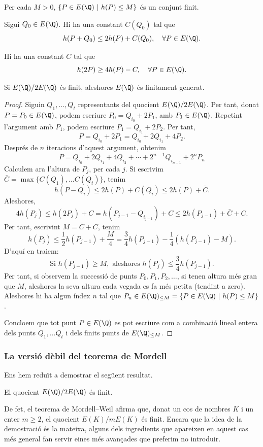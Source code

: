 \begin{remark}
Per cada $M>0$, $\{ P\in E(\Q) ~|~ h(P) \leq M\}$ és un conjunt finit.
\end{remark}

\begin{lemma}
Sigui $Q_0\in E(\Q)$. Hi ha una constant $C(Q_0)$ tal que
\[
h(P+Q_0)\leq 2h(P) + C(Q_0), \quad \forall P\in E(\Q).
\]
\end{lemma}
\begin{lemma}
Hi ha una constant $C$ tal que
\[
h(2P)\geq 4h(P) - C,\quad \forall P\in E(\Q).
\]
\end{lemma}

\begin{theorem}
Si $E(\Q)/2E(\Q)$ és finit, aleshores $E(\Q)$ és finitament generat.
\end{theorem}
\begin{proof}
Siguin $Q_1,\ldots, Q_t$ representants del quocient $E(\Q)/2E(\Q)$.
Per tant, donat $P=P_0\in E(\Q)$, podem escriure $P_0 = Q_{i_0} + 2P_1$, amb $P_1\in E(\Q)$. Repetint l'argument amb $P_1$, podem escriure $P_1 = Q_{i_1} + 2P_2$. Per tant,
\[
P = Q_{i_0} + 2P_1 = Q_{i_0} + 2Q_{i_1} + 4P_2.
\]
Després de $n$ iteracions d'aquest argument, obtenim
\[
P = Q_{i_0} + 2Q_{i_1} + 4Q_{i_2}+\cdots +2^{n-1} Q_{i_{n-1}} + 2^{n}P_n
\]
Calculem ara l'altura de $P_j$, per cada $j$. Si escrivim $\bar C = \max\{ C(Q_1),\ldots C(Q_t)\}$, tenim
\[
h(P - Q_i) \leq 2h(P) + C(Q_i)\leq 2h(P) + \bar C.
\]
Aleshores,
\[
4h(P_j)\leq h(2P_j) + C = h(P_{j-1} - Q_{i_{j-1}}) + C\leq 2h(P_{j-1}) + \bar C + C.
\]
Per tant, escrivint $M=\bar C + C$, tenim
\[
h(P_j)\leq \frac{1}{2} h(P_{j-1}) + \frac{M}{4} = \frac{3}{4} h(P_{j-1}) - \frac 14\left(h(P_{j-1}) - M\right).
\]
D'aquí en traiem:
\[
\text{Si } h(P_{j-1})\geq M,\text{ aleshores } h(P_j)\leq \frac 34 h(P_{j-1}).
\]
Per tant, si observem la successió de punts $P_0, P_1, P_2, \ldots$, si tenen altura més gran que $M$, aleshores la seva altura cada vegada es fa més petita (tendint a zero). Aleshores hi ha algun índex $n$ tal que $P_n\in E(\Q)_{\leq M} = \{ P\in E(\Q) ~|~ h(P) \leq M\}$.

Concloem que tot punt $P\in E(\Q)$ es pot escriure com a combinació lineal entera dels punts $Q_1,\ldots Q_t$ i dels finits punts de $E(\Q)_{\leq M}$.
\end{proof}

 \subsubsection{La versió dèbil del teorema de Mordell}
 Ens hem reduït a demostrar el següent resultat.
 \begin{theorem}
 El quocient $E(\Q)/2E(\Q)$ és finit.
 \end{theorem}
 \begin{remark}
 De fet, el teorema de Mordell--Weil afirma que, donat un cos de nombres $K$ i un enter $m\geq 2$, el quocient $E(K)/mE(K)$ és finit. Encara que la idea de la demostració és la mateixa, alguns dels ingredients que apareixen en aquest cas més general fan servir eines més avançades que preferim no introduir.
 \end{remark}
 
